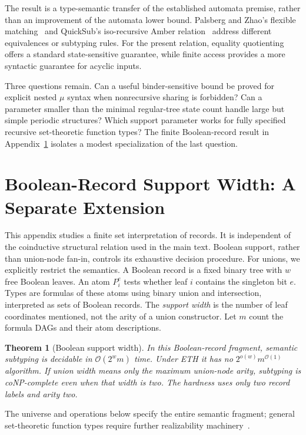 \documentclass[11pt,letterpaper]{article}
\newtheorem{theorem}{Theorem}
\theoremstyle{definition}\newtheorem{definition}[theorem]{Definition}
\newcommand{\Oh}{\mathcal O}
\begin{document}
The result is a type-semantic transfer of the established automata premise, rather than an improvement of the automata lower bound. Palsberg and Zhao's flexible matching~\cite{PZ01} and QuickSub's iso-recursive Amber relation~\cite{QuickSub25} address different equivalences or subtyping rules. For the present relation, equality quotienting offers a standard state-sensitive guarantee, while finite access provides a more syntactic guarantee for acyclic inputs.

Three questions remain. Can a useful binder-sensitive bound be proved for explicit nested $\mu$ syntax when nonrecursive sharing is forbidden? Can a parameter smaller than the minimal regular-tree state count handle large but simple periodic structures? Which support parameter works for fully specified recursive set-theoretic function types? The finite Boolean-record result in Appendix~\ref{sec:boolean} isolates a modest specialization of the last question.

\clearpage
\appendix
\section{Boolean-Record Support Width: A Separate Extension}\label{sec:boolean}
This appendix studies a finite set interpretation of records. It is independent of the coinductive structural relation used in the main text. Boolean support, rather than union-node fan-in, controls its exhaustive decision procedure.
For unions, we explicitly restrict the semantics. A Boolean record is a fixed binary tree with $w$ free Boolean leaves. An atom $P_i^e$ tests whether leaf $i$ contains the singleton bit $e$. Types are formulas of these atoms using binary union and intersection, interpreted as sets of Boolean records. The \emph{support width} is the number of leaf coordinates mentioned, not the arity of a union constructor. Let $m$ count the formula DAGs and their atom descriptions.

\begin{theorem}[Boolean support width]\label{thm:C}
In this Boolean-record fragment, semantic subtyping is decidable in $\Oh(2^w m)$ time. Under ETH it has no $2^{o(w)}m^{\Oh(1)}$ algorithm. If union width means only the maximum union-node arity, subtyping is coNP-complete even when that width is two. The hardness uses only two record labels and arity two.
\end{theorem}
The universe and operations below specify the entire semantic fragment; general set-theoretic function types require further realizability machinery~\cite{FCB08}.
\end{document}
